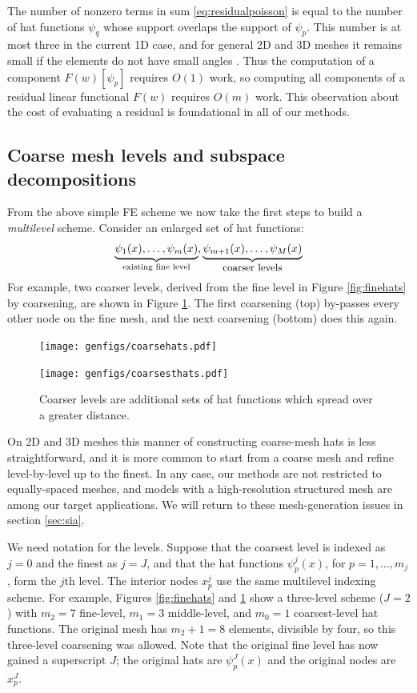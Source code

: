 \documentclass[letterpaper,final,12pt,reqno]{amsart}
\theoremstyle{claim}
\numberwithin{equation}{section}
\numberwithin{figure}{section}
\numberwithin{table}{section}
\numberwithin{theorem}{section}
\begin{document}
The number of nonzero terms in sum \eqref{eq:residualpoisson} is equal to the number of hat functions $\psi_q$ whose support overlaps the support of $\psi_p$.  This number is at most three in the current 1D case, and for general 2D and 3D meshes it remains small if the elements do not have small angles \cite{Braess2007}.  Thus the computation of a component $F(w)[\psi_p]$ requires $O(1)$ work, so computing all components of a residual linear functional $F(w)$ requires $O(m)$ work.  This observation about the cost of evaluating a residual is foundational in all of our methods.

\subsection{Coarse mesh levels and subspace decompositions} \label{subsec:coarselevels}  From the above simple FE scheme we now take the first steps to build a \emph{multilevel} scheme.  Consider an enlarged set of hat functions:
    $$\underbrace{\psi_1(x),\dots,\psi_m(x)}_{\text{existing fine level}},\underbrace{\psi_{m+1}(x),\dots,\psi_M(x)}_{\text{\small coarser levels}}$$
For example, two coarser levels, derived from the fine level in Figure \ref{fig:finehats} by coarsening, are shown in Figure \ref{fig:coarsehats}.  The first coarsening (top) by-passes every other node on the fine mesh, and the next coarsening (bottom) does this again.

\begin{figure}
\texttt{[image: genfigs/coarsehats.pdf]}
\smallskip

\texttt{[image: genfigs/coarsesthats.pdf]}
\caption{Coarser levels are additional sets of hat functions which spread over a greater distance.}
\label{fig:coarsehats}
\end{figure}

On 2D and 3D meshes this manner of constructing coarse-mesh hats is less straightforward, and it is more common to start from a coarse mesh and refine level-by-level up to the finest.  In any case, our methods are not restricted to equally-spaced meshes, and models with a high-resolution structured mesh \cite[for example]{Bueler2016,Winkelmannetal2011} are among our target applications. We will return to these mesh-generation issues in section \ref{sec:sia}.

We need notation for the levels.  Suppose that the coarsest level is indexed as $j=0$ and the finest as $j=J$, and that the hat functions $\psi_p^j(x)$, for $p=1,\dots,m_j$, form the $j$th level.  The interior nodes $x_p^j$ use the same multilevel indexing scheme.  For example, Figures \ref{fig:finehats} and \ref{fig:coarsehats} show a three-level scheme ($J=2$) with $m_2=7$ fine-level, $m_1=3$ middle-level, and $m_0=1$ coarsest-level hat functions.  The original mesh has $m_2+1=8$ elements, divisible by four, so this three-level coarsening was allowed.  Note that the original fine level has now gained a superscript $J$; the original hats are $\psi_p^J(x)$ and the original nodes are $x_p^J$.
\end{document}
